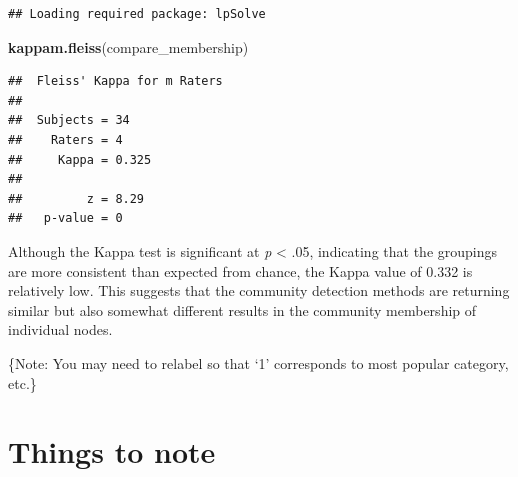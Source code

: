 \documentclass[
]{book}
\newenvironment{Shaded}{\begin{snugshade}}{\end{snugshade}}
\newcommand{\AttributeTok}[1]{\textcolor[rgb]{0.13,0.29,0.53}{#1}}
\newcommand{\CommentTok}[1]{\textcolor[rgb]{0.56,0.35,0.01}{\textit{#1}}}
\newcommand{\FunctionTok}[1]{\textcolor[rgb]{0.13,0.29,0.53}{\textbf{#1}}}
\newcommand{\NormalTok}[1]{#1}
\newcommand{\OtherTok}[1]{\textcolor[rgb]{0.56,0.35,0.01}{#1}}
\newcommand{\SpecialCharTok}[1]{\textcolor[rgb]{0.81,0.36,0.00}{\textbf{#1}}}
\begin{document}
\begin{Shaded}
\end{Shaded}

\begin{verbatim}
## Loading required package: lpSolve
\end{verbatim}

\begin{Shaded}
\begin{Highlighting}[]
\FunctionTok{kappam.fleiss}\NormalTok{(compare\_membership)}
\end{Highlighting}
\end{Shaded}

\begin{verbatim}
##  Fleiss' Kappa for m Raters
## 
##  Subjects = 34 
##    Raters = 4 
##     Kappa = 0.325 
## 
##         z = 8.29 
##   p-value = 0
\end{verbatim}

Although the Kappa test is significant at \emph{p} \textless{} .05, indicating that the groupings are more consistent than expected from chance, the Kappa value of 0.332 is relatively low. This suggests that the community detection methods are returning similar but also somewhat different results in the community membership of individual nodes.

\{Note: You may need to relabel so that `1' corresponds to most popular category, etc.\}

\section{Things to note}\label{things-to-note}
\end{document}
